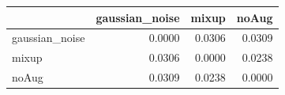 \begin{tabular}{lrrr}
\toprule
 & gaussian_noise & mixup & noAug \\
\midrule
gaussian_noise & 0.0000 & 0.0306 & 0.0309 \\
mixup & 0.0306 & 0.0000 & 0.0238 \\
noAug & 0.0309 & 0.0238 & 0.0000 \\
\bottomrule
\end{tabular}
